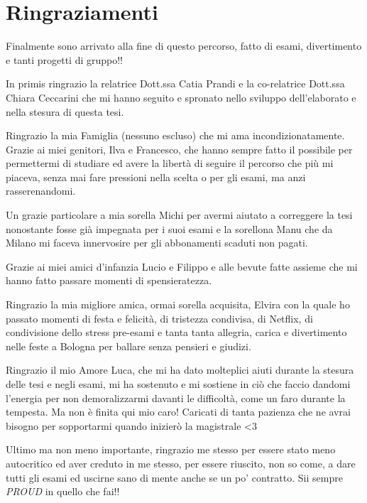 \chapter{Ringraziamenti}
\thispagestyle{empty}

Finalmente sono arrivato alla fine di questo percorso, fatto di esami, divertimento e tanti progetti di gruppo!!

In primis ringrazio la relatrice Dott.ssa Catia Prandi e la co-relatrice Dott.ssa Chiara Ceccarini che mi hanno seguito e spronato nello sviluppo dell'elaborato e nella stesura di questa tesi.
\vspace{10pt}

Ringrazio la mia Famiglia (nessuno escluso) che mi ama incondizionatamente. Grazie ai miei genitori, Ilva e Francesco, che hanno sempre fatto il possibile per permettermi di studiare ed avere la libertà di seguire il percorso che più mi piaceva, senza mai fare pressioni nella scelta o per gli esami, ma anzi rasserenandomi. 

Un grazie particolare a mia sorella Michi per avermi aiutato a correggere la tesi nonostante fosse già impegnata per i suoi esami e la sorellona Manu che da Milano mi faceva innervosire per gli abbonamenti scaduti non pagati.
\vspace{10pt}

Grazie ai miei amici d'infanzia Lucio e Filippo e alle bevute fatte assieme che mi hanno fatto passare momenti di spensieratezza.
\vspace{10pt}

Ringrazio la mia migliore amica, ormai sorella acquisita, Elvira con la quale ho passato momenti di festa e felicità, di tristezza condivisa, di Netflix, di condivisione dello stress pre-esami e tanta tanta allegria, carica e divertimento nelle feste a Bologna per ballare senza pensieri e giudizi.
\vspace{10pt}

Ringrazio il mio Amore Luca, che mi ha dato molteplici aiuti durante la stesura delle tesi e negli esami, mi ha sostenuto e mi sostiene in ciò che faccio dandomi l'energia per non demoralizzarmi davanti le difficoltà, come un faro durante la tempesta. Ma non è finita qui mio caro! Caricati di tanta pazienza che ne avrai bisogno per sopportarmi quando inizierò la magistrale <3
\vspace{10pt}

Ultimo ma non meno importante, ringrazio me stesso per essere stato meno autocritico ed aver creduto in me stesso, per essere riuscito, non so come, a dare tutti gli esami ed uscirne sano di mente anche se un po' contratto. Sii sempre \textit{PROUD} in quello che fai!!
\vspace{10pt}

